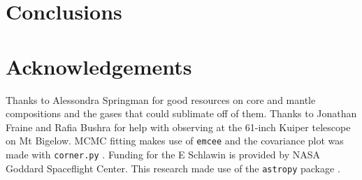 \documentclass[twocolumn]{aastex61}
\begin{document}
\section{Conclusions}\label{sec:conclusions}

\section{Acknowledgements}
Thanks to Alessondra Springman for good resources on core and mantle compositions and the gases that could sublimate off of them.
Thanks to Jonathan Fraine and Rafia Bushra for help with observing at the 61-inch Kuiper telescope on Mt Bigelow.
MCMC fitting makes use of \texttt{emcee} \citep{foreman-mackey2013emcee} and the covariance plot was made with \texttt{corner.py} \citep{foremanCorner}.
Funding for the E Schlawin is provided by NASA Goddard Spaceflight Center.
This research made use of the \texttt{astropy} package \citep{astropy2013}.






\end{document}
